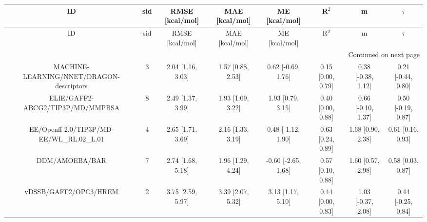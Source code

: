 \documentclass[8pt]{article}
\begin{document}
\begin{center}
\begin{footnotesize}
\begin{longtable}{|cccccccc|}
\toprule
                                       ID & sid &   RMSE [kcal/mol] &    MAE [kcal/mol] &       ME [kcal/mol] &             R$^2$ &                  m &             $\tau$ \\
\midrule
\endfirsthead

\toprule
                                       ID & sid &   RMSE [kcal/mol] &    MAE [kcal/mol] &       ME [kcal/mol] &             R$^2$ &                  m &             $\tau$ \\
\midrule
\endhead
\midrule
\multicolumn{8}{r}{{Continued on next page}} \\
\midrule
\endfoot

\bottomrule
\endlastfoot
 MACHINE-LEARNING/NNET/DRAGON-descriptors &   3 & 2.04 [1.16, 3.03] & 1.57 [0.88, 2.53] &  0.62 [-0.69, 1.76] & 0.15 [0.00, 0.79] & 0.38 [-0.38, 1.12] & 0.21 [-0.44, 0.80] \\
         ELIE/GAFF2-ABCG2/TIP3P/MD/MMPBSA &   8 & 2.49 [1.37, 3.99] & 1.93 [1.09, 3.22] &   1.93 [0.79, 3.15] & 0.40 [0.00, 0.88] & 0.66 [-0.10, 1.37] & 0.50 [-0.19, 0.87] \\
EE/Openff-2.0/TIP3P/MD-EE/WL\_RL.02\_L.01 &   4 & 2.65 [1.71, 3.69] & 2.16 [1.33, 3.19] &  0.48 [-1.12, 1.90] & 0.63 [0.24, 0.89] &  1.68 [0.90, 2.38] &  0.61 [0.16, 0.93] \\
                           DDM/AMOEBA/BAR &   7 & 2.74 [1.68, 5.18] & 1.96 [1.29, 4.24] & -0.60 [-2.65, 1.68] & 0.57 [0.10, 0.88] &  1.60 [0.57, 2.98] &  0.58 [0.03, 0.87] \\
                    vDSSB/GAFF2/OPC3/HREM &   2 & 3.75 [2.59, 5.97] & 3.39 [2.07, 5.32] &   3.13 [1.17, 5.10] & 0.44 [0.00, 0.83] & 1.03 [-0.37, 2.08] & 0.44 [-0.25, 0.84] \\
\end{longtable}
\end{footnotesize}
\end{center}
\end{document}
